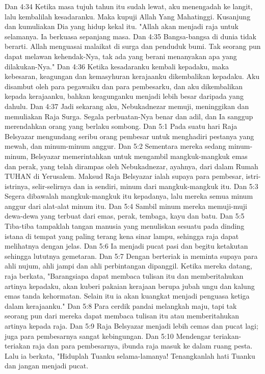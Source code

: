 Dan 4:34  Ketika masa tujuh tahun itu sudah lewat, aku menengadah ke langit, lalu kembalilah kesadaranku. Maka kupuji Allah Yang Mahatinggi. Kusanjung dan kumuliakan Dia yang hidup kekal itu. "Allah akan menjadi raja untuk selamanya. Ia berkuasa sepanjang masa.
Dan 4:35  Bangsa-bangsa di dunia tidak berarti. Allah menguasai malaikat di surga dan penduduk bumi. Tak seorang pun dapat melawan kehendak-Nya, tak ada yang berani menanyakan apa yang dilakukan-Nya."
Dan 4:36  Ketika kesadaranku kembali kepadaku, maka kebesaran, keagungan dan kemasyhuran kerajaanku dikembalikan kepadaku. Aku disambut oleh para pegawaiku dan para pembesarku, dan aku dikembalikan kepada kerajaanku, bahkan keagunganku menjadi lebih besar daripada yang dahulu.
Dan 4:37  Jadi sekarang aku, Nebukadnezar memuji, meninggikan dan memuliakan Raja Surga. Segala perbuatan-Nya benar dan adil, dan Ia sanggup merendahkan orang yang berlaku sombong.
Dan 5:1  Pada suatu hari Raja Belsyazar mengundang seribu orang pembesar untuk menghadiri pestanya yang mewah, dan minum-minum anggur.
Dan 5:2  Sementara mereka sedang minum-minum, Belsyazar memerintahkan untuk mengambil mangkuk-mangkuk emas dan perak, yang telah dirampas oleh Nebukadnezar, ayahnya, dari dalam Rumah TUHAN di Yerusalem. Maksud Raja Belsyazar ialah supaya para pembesar, istri-istrinya, selir-selirnya dan ia sendiri, minum dari mangkuk-mangkuk itu.
Dan 5:3  Segera dibawalah mangkuk-mangkuk itu kepadanya, lalu mereka semua minum anggur dari alat-alat minum itu.
Dan 5:4  Sambil minum mereka memuji-muji dewa-dewa yang terbuat dari emas, perak, tembaga, kayu dan batu.
Dan 5:5  Tiba-tiba tampaklah tangan manusia yang menuliskan sesuatu pada dinding istana di tempat yang paling terang kena sinar lampu, sehingga raja dapat melihatnya dengan jelas.
Dan 5:6  Ia menjadi pucat pasi dan begitu ketakutan sehingga lututnya gemetaran.
Dan 5:7  Dengan berteriak ia meminta supaya para ahli nujum, ahli jampi dan ahli perbintangan dipanggil. Ketika mereka datang, raja berkata, "Barangsiapa dapat membaca tulisan itu dan memberitahukan artinya kepadaku, akan kuberi pakaian kerajaan berupa jubah ungu dan kalung emas tanda kehormatan. Selain itu ia akan kuangkat menjadi penguasa ketiga dalam kerajaanku."
Dan 5:8  Para cerdik pandai melangkah maju, tapi tak seorang pun dari mereka dapat membaca tulisan itu atau memberitahukan artinya kepada raja.
Dan 5:9  Raja Belsyazar menjadi lebih cemas dan pucat lagi; juga para pembesarnya sangat kebingungan.
Dan 5:10  Mendengar teriakan-teriakan raja dan para pembesarnya, ibunda raja masuk ke dalam ruang pesta. Lalu ia berkata, "Hiduplah Tuanku selama-lamanya! Tenangkanlah hati Tuanku dan jangan menjadi pucat.
